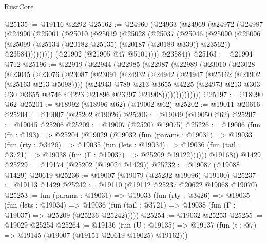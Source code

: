 \begin{lexlean}{RustCore}
\begin{coremodule}
@25135 := @19116 @2292
@25162 := @24960
    (@24963
      (@24969
        (@24972
          (@24987
            (@24990
              (@25001
                (@25010
                  (@25019
                    (@25028
                      (@25037
                        (@25046
                          (@25090
                            (@25096
                              (@25099 (@25134 (@20182 @25135) (@20187 (@20189 @339)) @23562))
                              @23584)))))))))
            (@21902 (@21905 @47 @5101))))
        @23584))
@25163 := @21904 @712
@25196 := @22919
    (@22944
      (@22985
        (@22987
          (@22989
            (@23010
              (@23028
                (@23045
                  (@23076
                    (@23087
                      (@23091
                        (@24932
                          (@24942
                            (@24947 (@25162 (@21902 (@25163 @213 @5098))))
                            (@24943
                              @789
                              @213
                              @3655
                              @4225
                              (@24973
                                @213
                                @303
                                @30
                                @3655
                                @3746
                                @4223
                                @21896
                                @23297
                                @21908))))))))))))))
@25197 := @18990 @62
@25201 := @18992 (@18996 @62) (@19002 @62)
@25202 := @19011 @20616
@25204 := @19007 (@25202 @19026)
@25206 := @19049 (@19050 @62)
@25207 := @19045 @25206
@25209 := @19007 (@25207 @19075)
@25226 := @19006
    (fun (fn : @193) =>
    @25204
      (@19029
        (@19032
          (fun (params : @19031) =>
          @19033
            (fun (rty : @3426) =>
            @19035
              (fun (lets : @19034) =>
              @19036 (fun (tail : @3721) => @19038 (fun (Γ : @19037) => @25209 @19122))))))
        @19168))
    @1429
@25229 := @19174 (@25202 (@19024 @1429))
@25232 := @19087 (@19088 @1429) @20619
@25236 := @19007 (@19079 (@25232 @19096) @19100)
@25237 := @19113 @1429
@25242 := @19110 (@19112 @25237 @20622 @19068 @19070)
@25253 := fun (params : @19031) =>
  @19033
    (fun (rty : @3426) =>
    @19035
      (fun (lets : @19034) =>
      @19036 (fun (tail : @3721) => @19038 (fun (Γ : @19037) => @25209 (@25236 @25242)))))
@25254 := @19032 @25253
@25255 := @19029 @25254
@25264 := @19136
    (fun (U : @19135) => @19137 (fun (t : @7) => @19145 (@19007 (@19151 @20619 @19025) @19162)))

\end{coremodule}
\end{lexlean}
